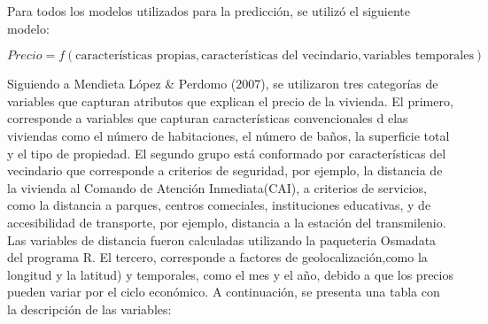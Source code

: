 \documentclass[
  11pt,
  letterpaper,
]{article}
\begin{document}
Para todos los modelos utilizados para la predicción, se utilizó el siguiente modelo:

\[
Precio= f(\text{características propias}, \text{características del vecindario},\text{variables temporales})
\]

Siguiendo a Mendieta López \& Perdomo (2007), se utilizaron tres categorías de variables que capturan atributos que explican el precio de la vivienda. El primero, corresponde a variables que capturan características convencionales d elas viviendas como el número de habitaciones, el número de baños, la superficie total y el tipo de propiedad. El segundo grupo está conformado por características del vecindario que corresponde a criterios de seguridad, por ejemplo, la distancia de la vivienda al Comando de Atención Inmediata(CAI), a criterios de servicios, como la distancia a parques, centros comeciales, instituciones educativas, y de accesibilidad de transporte, por ejemplo, distancia a la estación del transmilenio. Las variables de distancia fueron calculadas utilizando la paqueteria Osmadata del programa R. El tercero, corresponde a factores de geolocalización,como la longitud y la latitud) y temporales, como el mes y el año, debido a que los precios pueden variar por el ciclo económico. A continuación, se presenta una tabla con la descripción de las variables:
\end{document}
